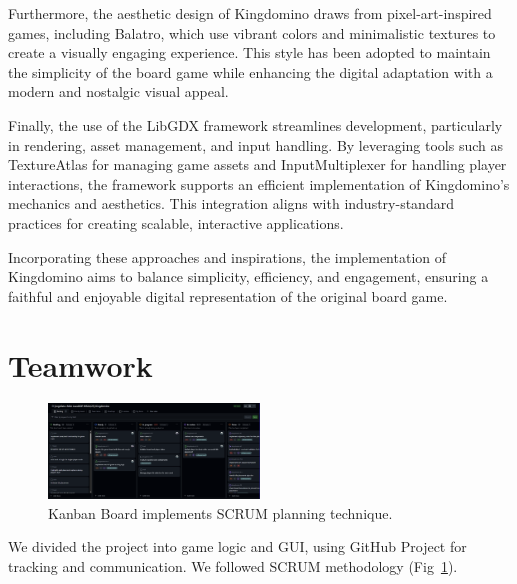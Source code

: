 \documentclass[conference]{IEEEtran}
\begin{document}
Furthermore, the aesthetic design of Kingdomino draws from pixel-art-inspired
games, including Balatro\cite{wiki:balatro}, which use vibrant colors and
minimalistic textures to create a visually engaging experience. This style has
been adopted to maintain the simplicity of the board game while enhancing the
digital adaptation with a modern and nostalgic visual appeal.

Finally, the use of the LibGDX framework\cite{libgdx} streamlines development,
particularly in rendering, asset management, and input handling. By leveraging
tools such as TextureAtlas\cite{wiki:textureatlas} for managing game assets and
InputMultiplexer for handling player interactions, the framework supports an
efficient implementation of Kingdomino's mechanics and aesthetics. This
integration aligns with industry-standard practices for creating scalable,
interactive applications.

Incorporating these approaches and inspirations, the implementation of
Kingdomino aims to balance simplicity, efficiency, and engagement, ensuring a
faithful and enjoyable digital representation of the original board game.


\section{Teamwork}

\begin{figure}[htbp]
    \centerline{\includegraphics[width=0.5\textwidth]{assets/github-project.png}}
    \caption{Kanban Board implements SCRUM planning technique.}\label{fig:kanban}
\end{figure}

We divided the project into game logic and GUI, using GitHub Project for tracking and communication. We followed SCRUM methodology (Fig~\ref{fig:kanban}).
\end{document}
